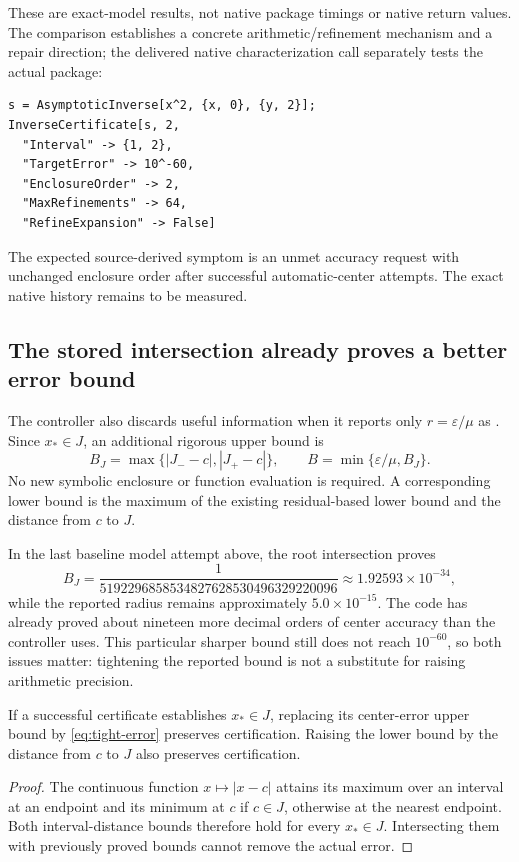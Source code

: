 These are exact-model results, not native package timings or native return values. The comparison establishes a concrete arithmetic/refinement mechanism and a repair direction; the delivered native characterization call separately tests the actual package:
\begin{lstlisting}
s = AsymptoticInverse[x^2, {x, 0}, {y, 2}];
InverseCertificate[s, 2,
  "Interval" -> {1, 2},
  "TargetError" -> 10^-60,
  "EnclosureOrder" -> 2,
  "MaxRefinements" -> 64,
  "RefineExpansion" -> False]
\end{lstlisting}
The expected source-derived symptom is an unmet accuracy request with unchanged enclosure order after successful automatic-center attempts. The exact native history remains to be measured.

\subsection{The stored intersection already proves a better error bound}

The controller also discards useful information when it reports only $r=\varepsilon/\mu$ as . Since $x_*\in J$, an additional rigorous upper bound is
\begin{equation}\label{eq:tight-error}
 B_J=\max\{|J_--c|,|J_+-c|\},\qquad
 B=\min\{\varepsilon/\mu,B_J\}.
\end{equation}
No new symbolic enclosure or function evaluation is required. A corresponding lower bound is the maximum of the existing residual-based lower bound and the distance from $c$ to $J$.

In the last baseline model attempt above, the root intersection proves
\[
 B_J=\frac{1}{5192296858534827628530496329220096}
 \approx1.92593\times10^{-34},
\]
while the reported radius remains approximately $5.0\times10^{-15}$. The code has already proved about nineteen more decimal orders of center accuracy than the controller uses. This particular sharper bound still does not reach $10^{-60}$, so both issues matter: tightening the reported bound is not a substitute for raising arithmetic precision.

\begin{proposition}
If a successful certificate establishes $x_*\in J$, replacing its center-error upper bound by \eqref{eq:tight-error} preserves certification. Raising the lower bound by the distance from $c$ to $J$ also preserves certification.
\end{proposition}
\begin{proof}
The continuous function $x\mapsto|x-c|$ attains its maximum over an interval at an endpoint and its minimum at $c$ if $c\in J$, otherwise at the nearest endpoint. Both interval-distance bounds therefore hold for every $x_*\in J$. Intersecting them with previously proved bounds cannot remove the actual error.
\end{proof}

